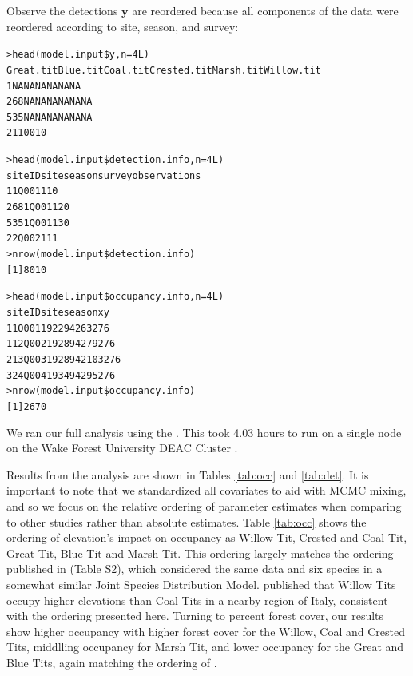Observe the detections $\mathbf{y}$ are reordered because all components of the data were reordered according to site, season, and survey:

\begin{alltt}
> head(model.input\$y, n=4L)
    Great.tit Blue.tit Coal.tit Crested.tit Marsh.tit Willow.tit
1          NA       NA       NA          NA        NA         NA
268        NA       NA       NA          NA        NA         NA
535        NA       NA       NA          NA        NA         NA
2           1        1        0           0         1          0
\end{alltt}

\begin{alltt}
> head(model.input\$detection.info, n=4L)
    siteID site season survey observations
1        1 Q001      1      1            0
268      1 Q001      1      2            0
535      1 Q001      1      3            0
2        2 Q002      1      1            1
> nrow(model.input\$detection.info)
[1] 8010

> head(model.input\$occupancy.info, n=4L)
   siteID site season      x      y
1       1 Q001      1 922942  63276
11      2 Q002      1 928942  79276
21      3 Q003      1 928942 103276
32      4 Q004      1 934942  95276
> nrow(model.input\$occupancy.info)
[1] 2670
\end{alltt}

We ran our full analysis using the .  This took 4.03 hours to run on a single node on the Wake Forest University DEAC Cluster \citep{WakeHPC}.

Results from the analysis are shown in Tables \ref{tab:occ} and \ref{tab:det}.  It is important to note that we standardized all covariates to aid with MCMC mixing, and so we focus on the relative ordering of parameter estimates when comparing to other studies rather than absolute estimates.  Table \ref{tab:occ} shows the ordering of elevation's impact on occupancy as Willow Tit, Crested 
 and Coal Tit, Great Tit, Blue Tit and Marsh Tit.  This ordering largely matches the ordering published in \citet{tobler2019joint} (Table S2), which considered the same data and six species in a somewhat similar Joint Species Distribution Model.  \citet{chamberlain2016alpine} published that Willow Tits occupy higher elevations than Coal Tits in a nearby region of Italy, consistent with the ordering presented here.  Turning to percent forest cover, our results show higher occupancy with higher forest cover for the Willow, Coal and Crested Tits, middlling occupancy for Marsh Tit, and lower occupancy for the Great and Blue Tits, again matching the ordering of \citet{tobler2019joint}. 

